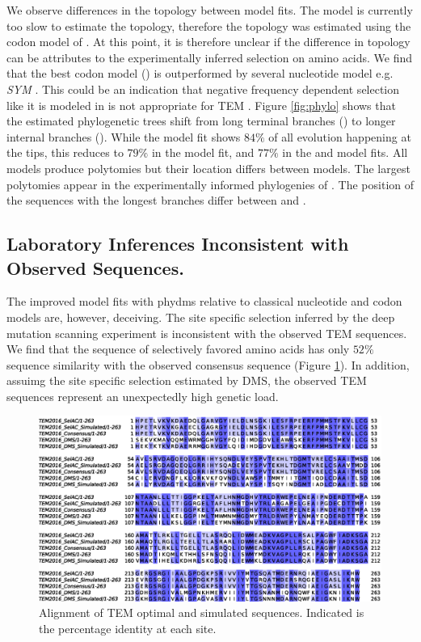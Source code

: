\documentclass[12pt]{article}
\begin{document}
We observe differences in the topology between model fits.
The \selac model is currently too slow to estimate the topology, therefore the topology was estimated using the codon model of \citet{KosiolEtAl07}.
At this point, it is therefore unclear if the difference in topology can be attributes to the experimentally inferred selection on amino acids.
We find that the best codon model (\gy) \citep{GoldmanAndYang1994} is outperformed by several nucleotide model e.g. \emph{SYM} \citep{zharkikh1994}.
This could be an indication that negative frequency dependent selection like it is modeled in \gy is not appropriate for TEM \citep{GoldmanAndYang1994,beaulieu2018}.
Figure \ref{fig:phylo} shows that the estimated phylogenetic trees shift from long terminal branches (\selac) to longer internal branches (\phydms).
While the \selac model fit shows $84 \%$ of all evolution happening at the tips, this reduces to $79 \%$ in the \selacDMS model fit, and $77 \%$ in the \phydms and \gy model fits.
All models produce polytomies but their location differs between models.
The largest polytomies appear in the experimentally informed phylogenies of \phydms.
The position of the sequences with the longest branches differ between \selac and \phydms.


\subsection*{Laboratory Inferences Inconsistent with Observed Sequences.}
The improved model fits with phydms relative to classical nucleotide and codon models are, however, deceiving.
The site specific selection inferred by the deep mutation scanning experiment is inconsistent with the observed TEM sequences.
We find that the sequence of selectively favored amino acids has only $52 \%$ sequence similarity with the observed consensus sequence (Figure \ref{fig:sim_seqs_cons}).
In addition, assuimg the site specific selection estimated by DMS, the observed TEM sequences represent an unexpectedly high genetic load.

\begin{figure}[H]
     \centering
	\includegraphics[width=\textwidth]{img/seq_simil_all.eps}
	\caption{Alignment of TEM optimal and simulated sequences. Indicated is the percentage identity at each site.}
	\label{fig:sim_seqs_cons}
\end{figure}
\end{document}
